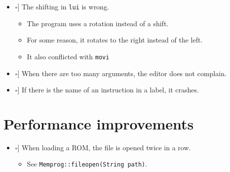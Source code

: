 \documentclass[12pt,a4paper]{extarticle}
\newcommand{\done}{\makebox[0pt][l]{$\square$}\raisebox{.15ex}{\hspace{0.1em}$\checkmark$}}%
\newcommand{\notdone}{\makebox[1em][l]{$\square$}}
\begin{document}
\begin{itemize}
  \item[\done] The shifting in \texttt{lui} is wrong.
    \begin{itemize}
      \item The program uses a rotation instead of a shift.
      \item For some reason, it rotates to the right instead of the left.
      \item It also conflicted with \texttt{movi}
    \end{itemize}

    \item[\notdone] When there are too many arguments, the editor does not complain.

    \item[\notdone] If there is the name of an instruction in a label, it crashes.


\end{itemize}

\section{Performance improvements}

\begin{itemize}
  \item[\notdone] When loading a ROM, the file is opened twice in a row.
    \begin{itemize}
      \item See \texttt{Memprog::fileopen(String path)}.
    \end{itemize}
  \end{itemize}
\end{document}

